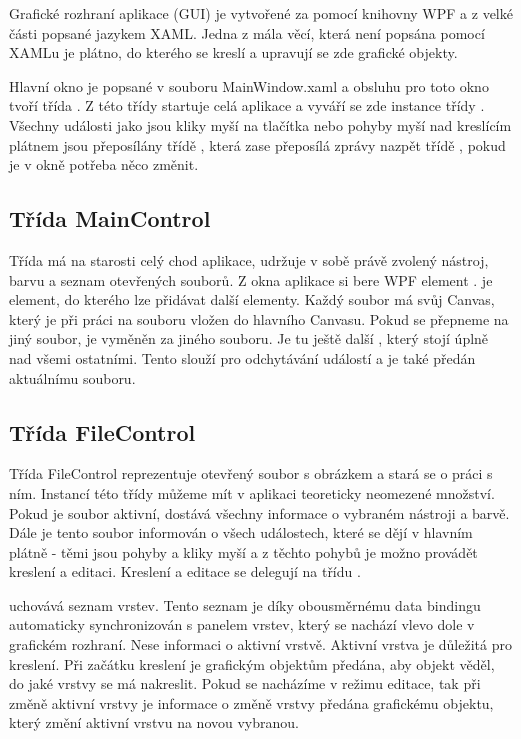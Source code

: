 \documentclass[
  field=inf,
  biblatex,
  glossaries,
  index
]{kidiplom}
\begin{document}
Grafické rozhraní aplikace (GUI) je vytvořené za pomocí knihovny WPF a z velké části popsané jazykem XAML. Jedna z mála věcí, která není popsána pomocí XAMLu je plátno, do kterého se kreslí a upravují se zde grafické objekty.

Hlavní okno je popsané v souboru MainWindow.xaml a obsluhu pro toto okno tvoří třída . Z této třídy startuje celá aplikace a vyváří se zde instance třídy . Všechny události jako jsou kliky myší na tlačítka nebo pohyby myší nad kreslícím plátnem jsou přeposílány třídě , která zase přeposílá zprávy nazpět třídě , pokud je v okně potřeba něco změnit.

\subsection{Třída MainControl}

Třída  má na starosti celý chod aplikace, udržuje v sobě právě zvolený nástroj, barvu a seznam otevřených souborů. Z okna aplikace si bere WPF element .  je element, do kterého lze přidávat další elementy. Každý soubor má svůj Canvas, který je při práci na souboru vložen do hlavního Canvasu. Pokud se přepneme na jiný soubor,  je vyměněn za  jiného souboru. Je tu ještě další , který stojí úplně nad všemi ostatními. Tento  slouží pro odchytávání událostí a je také předán aktuálnímu souboru.

\subsection{Třída FileControl}

Třída FileControl reprezentuje otevřený soubor s obrázkem a stará se o práci s ním. Instancí této třídy můžeme mít v aplikaci teoreticky neomezené množství. Pokud je soubor aktivní, dostává všechny informace o vybraném nástroji a barvě. Dále je tento soubor informován o všech událostech, které se dějí v hlavním plátně - těmi jsou pohyby a kliky myší a z těchto pohybů je možno provádět kreslení a editaci. Kreslení a editace se delegují na třídu .

 uchovává seznam vrstev. Tento seznam je díky obousměrnému data bindingu automaticky synchronizován s panelem vrstev, který se nachází vlevo dole v grafickém rozhraní. Nese informaci o aktivní vrstvě. Aktivní vrstva je důležitá pro kreslení. Při začátku kreslení je grafickým objektům předána, aby objekt věděl, do jaké vrstvy se má nakreslit. Pokud se nacházíme v režimu editace, tak při změně aktivní vrstvy je informace o změně vrstvy předána grafickému objektu, který změní aktivní vrstvu na novou vybranou.
\end{document}
